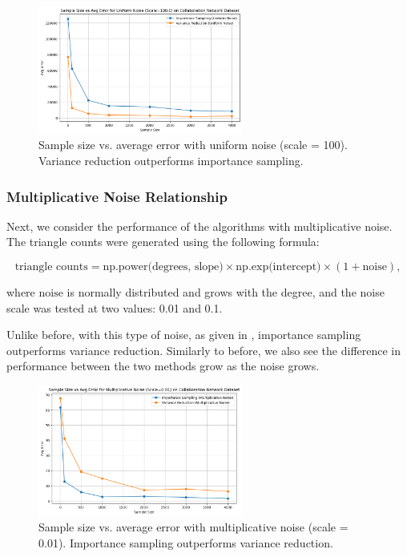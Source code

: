 \documentclass[11pt, margin=1in]{article}
\begin{document}
\begin{figure}[H]
    \centering
    \includegraphics[width=0.6\textwidth]{plots/simulated/percent_error_vs_sample_size_comparison_uniform_100.0.png}
    \caption{Sample size vs. average error with uniform noise (scale = 100). Variance reduction outperforms importance sampling.}
    \label{fig:uniform_noise_100}
\end{figure}

\subsubsection{Multiplicative Noise Relationship}

Next, we consider the performance of the algorithms with multiplicative noise.
The triangle counts were generated using the following formula:

\[
\text{triangle counts} = \text{np.power(degrees, slope)} \times \text{np.exp(intercept)} \times (1 + \text{noise}),
\]

where $\text{noise}$ is normally distributed and grows with the degree, and the noise scale was tested at two values: 0.01 and 0.1.

Unlike before, with this type of noise, as given in , importance sampling outperforms variance reduction.
Similarly to before, we also see the difference in performance between the two methods grow as the noise grows.

\begin{figure}[H]
    \centering
    \includegraphics[width=0.6\textwidth]{plots/simulated/percent_error_vs_sample_size_comparison_multiplicative_0.01.png}
    \caption{Sample size vs. average error with multiplicative noise (scale = 0.01). Importance sampling outperforms variance reduction.}
    \label{fig:multiplicative_noise_001}
\end{figure}
\end{document}
